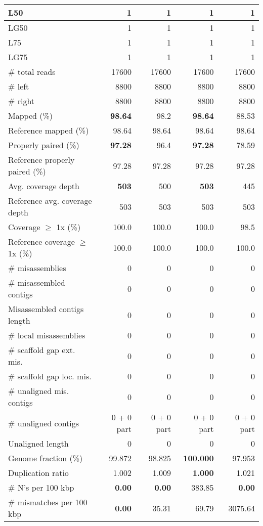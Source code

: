 \documentclass[12pt,a4paper]{article}
\begin{document}
\begin{table}[ht]
\begin{center}
\begin{tabular}{|l*{4}{|r}|}
L50 & 1 & 1 & 1 & 1 \\ \hline
LG50 & 1 & 1 & 1 & 1 \\ \hline
L75 & 1 & 1 & 1 & 1 \\ \hline
LG75 & 1 & 1 & 1 & 1 \\ \hline
\# total reads & 17600 & 17600 & 17600 & 17600 \\ \hline
\# left & 8800 & 8800 & 8800 & 8800 \\ \hline
\# right & 8800 & 8800 & 8800 & 8800 \\ \hline
Mapped (\%) & {\bf 98.64} & 98.2 & {\bf 98.64} & 88.53 \\ \hline
Reference mapped (\%) & 98.64 & 98.64 & 98.64 & 98.64 \\ \hline
Properly paired (\%) & {\bf 97.28} & 96.4 & {\bf 97.28} & 78.59 \\ \hline
Reference properly paired (\%) & 97.28 & 97.28 & 97.28 & 97.28 \\ \hline
Avg. coverage depth & {\bf 503} & 500 & {\bf 503} & 445 \\ \hline
Reference avg. coverage depth & 503 & 503 & 503 & 503 \\ \hline
Coverage $\geq$ 1x (\%) & 100.0 & 100.0 & 100.0 & 98.5 \\ \hline
Reference coverage $\geq$ 1x (\%) & 100.0 & 100.0 & 100.0 & 100.0 \\ \hline
\# misassemblies & 0 & 0 & 0 & 0 \\ \hline
\# misassembled contigs & 0 & 0 & 0 & 0 \\ \hline
Misassembled contigs length & 0 & 0 & 0 & 0 \\ \hline
\# local misassemblies & 0 & 0 & 0 & 0 \\ \hline
\# scaffold gap ext. mis. & 0 & 0 & 0 & 0 \\ \hline
\# scaffold gap loc. mis. & 0 & 0 & 0 & 0 \\ \hline
\# unaligned mis. contigs & 0 & 0 & 0 & 0 \\ \hline
\# unaligned contigs & 0 + 0 part & 0 + 0 part & 0 + 0 part & 0 + 0 part \\ \hline
Unaligned length & 0 & 0 & 0 & 0 \\ \hline
Genome fraction (\%) & 99.872 & 98.825 & {\bf 100.000} & 97.953 \\ \hline
Duplication ratio & 1.002 & 1.009 & {\bf 1.000} & 1.021 \\ \hline
\# N's per 100 kbp & {\bf 0.00} & {\bf 0.00} & 383.85 & {\bf 0.00} \\ \hline
\# mismatches per 100 kbp & {\bf 0.00} & 35.31 & 69.79 & 3075.64 \\ \hline

\end{tabular}
\end{center}
\end{table}
\end{document}
